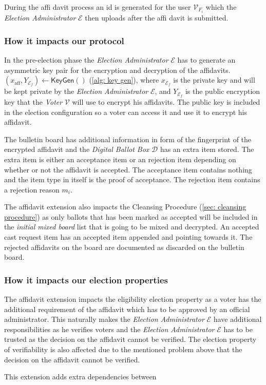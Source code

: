 During the affi davit process an id is generated for the user $\mathcal{V}_{{F}_i}$ which the \textit{Election Administrator} $\mathcal{E}$ then uploads after the affi davit is submitted.


\subsubsection{How it impacts our protocol}
In the pre-election phase the \textit{Election Administrator} $\mathcal{E}$ has to generate an asymmetric key pair for the encryption and decryption of the affidavits. \( (x_\mathrm{aff}, Y_{\mathcal{E}_f}) \leftarrow \mathsf{KeyGen}() \) (\cref{alg: key gen}), where $x_{\mathcal{E}_f}$ is the private key and will be kept private by the \textit{Election Administrator} $\mathcal{E}$, and $Y_{\mathcal{E}_f}$ is the public encryption key that the \textit{Voter} $\mathcal{V}$ will use to encrypt his affidavits. The public key is included in the election configuration so a voter can access it and use it to encrypt his affidavit.

The bulletin board has additional information in form of the fingerprint of the encrypted affidavit and the \textit{Digital Ballot Box} $\mathcal{D}$ has an extra item stored. The extra item is either an acceptance item or an rejection item depending on whether or not the affidavit is accepted. The acceptance item contains nothing and the item type in itself is the proof of acceptance. The rejection item contains a rejection reason $m_i$. 

The affidavit extension also impacts the Cleansing Procedure (\cref{sec: cleansing procedure}) as only ballots that has been marked as accepted will be included in the \textit{initial mixed board} list that is going to be mixed and decrypted. An accepted cast request item has an accepted item appended and pointing towards it. The rejected affidavits on the board are documented as discarded on the bulletin board. 


\subsubsection{How it impacts our election properties}
The affidavit extension impacts the eligibility election property as a voter has the additional requirement of the affidavit which has to be approved by an official administrator. This naturally makes the \textit{Election Administrator} $\mathcal{E}$ have additional responsibilities as he verifies voters and the \textit{Election Administrator} $\mathcal{E}$ has to be trusted as the decision on the affidavit cannot be verified.
The election property of verifiability is also affected due to the mentioned problem above that the decision on the affidavit cannot be verified.

This extension adds extra dependencies between
